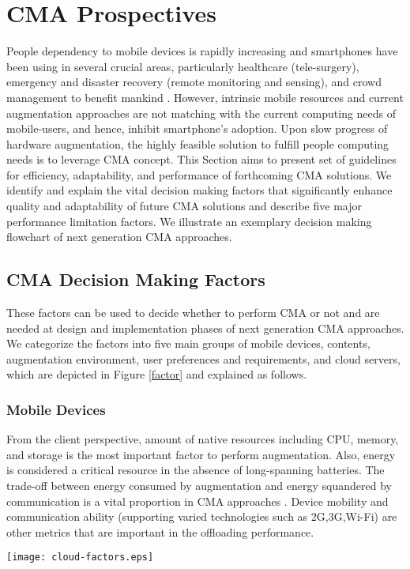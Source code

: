 \documentclass[publish]{IEEEtran}
\begin{document}
\section{CMA Prospectives}\label{sec:cma-prospectives}
People dependency to mobile devices is rapidly increasing \cite{Survey2011, Gartner2012} and smartphones have been using in several crucial areas, particularly healthcare (tele-surgery), emergency and disaster recovery (remote monitoring and sensing), and crowd management to benefit mankind \cite{Viswanathan2012,Koukoumidis2012,Kranz2012}. However, intrinsic mobile resources and current augmentation approaches are not matching with the current computing needs of mobile-users, and hence, inhibit smartphone's adoption. Upon slow progress of hardware augmentation, the highly feasible solution to fulfill people computing needs is to leverage CMA concept. This Section aims to present set of guidelines for efficiency, adaptability, and performance of forthcoming CMA solutions. We identify and explain the vital decision making factors that significantly enhance quality and adaptability of future CMA solutions and describe five major performance limitation factors. We illustrate an exemplary decision making flowchart of next generation CMA approaches.

\subsection{CMA Decision Making Factors}
These factors can be used to decide whether to perform CMA or not and are needed at design and implementation phases of next generation CMA approaches. We categorize the factors into five main groups of mobile devices, contents, augmentation environment, user preferences and requirements, and cloud servers, which are depicted in Figure \ref{factor} and explained as follows.

\subsubsection{Mobile Devices}
From the client perspective, amount of native resources including CPU, memory, and storage is the most important factor to perform augmentation. Also, energy is considered a critical resource in the absence of long-spanning batteries. The trade-off between energy consumed by augmentation and energy squandered by communication is a vital proportion in CMA approaches \cite{Miettinen2010}. Device mobility and communication ability (supporting varied technologies such as 2G,3G,Wi-Fi) are other metrics that are important in the offloading performance. 
\begin{figure*}[t]
\begin{center}
\texttt{[image: cloud-factors.eps]}
\caption{Critical Factors in CMA Decision Making.} \label{factor}
\end{center}
\end{figure*}
\end{document}
